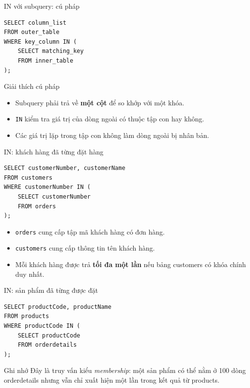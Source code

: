 \documentclass[aspectratio=169,10pt]{beamer}
\newcommand{\code}[1]{\texttt{#1}}
\begin{document}
\begin{frame}[fragile]{IN với subquery: cú pháp}
\begin{lstlisting}
SELECT column_list
FROM outer_table
WHERE key_column IN (
    SELECT matching_key
    FROM inner_table
);
\end{lstlisting}
\begin{block}{Giải thích cú pháp}
\begin{itemize}
\item Subquery phải trả về \textbf{một cột} để so khớp với một khóa.
\item \code{IN} kiểm tra giá trị của dòng ngoài có thuộc tập con hay không.
\item Các giá trị lặp trong tập con không làm dòng ngoài bị nhân bản.
\end{itemize}
\end{block}
\end{frame}

\begin{frame}[fragile]{IN: khách hàng đã từng đặt hàng}
\begin{lstlisting}
SELECT customerNumber, customerName
FROM customers
WHERE customerNumber IN (
    SELECT customerNumber
    FROM orders
);
\end{lstlisting}
\begin{itemize}
\item \code{orders} cung cấp tập mã khách hàng có đơn hàng.
\item \code{customers} cung cấp thông tin tên khách hàng.
\item Mỗi khách hàng được trả \textbf{tối đa một lần} nếu bảng customers có khóa chính duy nhất.
\end{itemize}
\end{frame}

\begin{frame}[fragile]{IN: sản phẩm đã từng được đặt}
\begin{lstlisting}
SELECT productCode, productName
FROM products
WHERE productCode IN (
    SELECT productCode
    FROM orderdetails
);
\end{lstlisting}
\begin{block}{Ghi nhớ}
\small Đây là truy vấn kiểu \emph{membership}: một sản phẩm có thể nằm ở 100 dòng orderdetails nhưng vẫn chỉ xuất hiện một lần trong kết quả từ products.
\end{block}
\end{frame}
\end{document}

